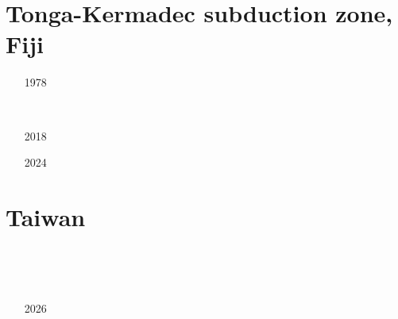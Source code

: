 \section{Tonga-Kermadec subduction zone, Fiji }

\begin{small}
\begin{itemize}
\item[1978]
\item[\twothousandthree] 
 \\
\item[\twothousandsix] 
\item[\twothousandsixteen] 
\item[\twothousandseventeen] 
\item[2018]
\item[\twothousandtwentyone] 
\item[\twothousandtwentythree] 
\item[2024]
\end{itemize}
\end{small}

\section{Taiwan}

\begin{small}
\begin{itemize}
\item[\twothousandone]
\item[\twothousandsix]
\item[\twothousandeight]
\item[\twothousandnine]
 \\
\item[\twothousandsixteen]
 \\ 
\item[\twothousandnineteen]
\item[\twothousandtwenty]
\item[\twothousandtwentyone]
\item[2026] 
\end{itemize}
\end{small}

